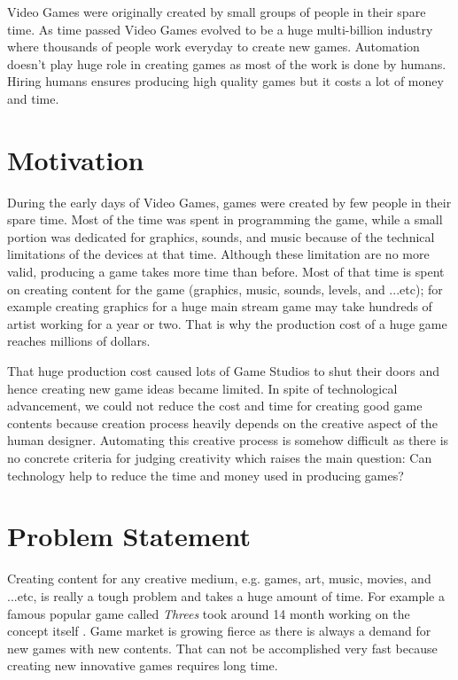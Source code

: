 Video Games were originally created by small groups of people in their spare time. As time passed Video Games evolved to be a huge multi-billion industry where thousands of people work everyday to create new games. Automation doesn't play huge role in creating games as most of the work is done by humans. Hiring humans ensures producing high quality games but it costs a lot of money and time.

\section{Motivation}
During the early days of Video Games, games were created by few people in their spare time. Most of the time was spent in programming the game, while a small portion was dedicated for graphics, sounds, and music because of the technical limitations of the devices at that time. Although these limitation are no more valid, producing a game takes more time than before. Most of that time is spent on creating content for the game (graphics, music, sounds, levels, and ...etc)\cite{budgetAAA}; for example creating graphics for a huge main stream game may take hundreds of artist working for a year or two. That is why the production cost of a huge game reaches millions of dollars\cite{gameCost}.\\\par

That huge production cost caused lots of Game Studios to shut their doors \cite{gameCloses} and hence creating new game ideas became limited. In spite of technological advancement, we could not reduce the cost and time for creating good game contents because creation process heavily depends on the creative aspect of the human designer. Automating this creative process is somehow difficult as there is no concrete criteria for judging creativity which raises the main question: Can technology help to reduce the time and money used in producing games?

\section{Problem Statement}
Creating content for any creative medium, e.g. games, art, music, movies, and ...etc, is really a tough problem and takes a huge amount of time. For example a famous popular game called \emph{Threes} took around 14 month working on the concept itself \cite{threesTime}. Game market is growing fierce as there is always a demand for new games with new contents. That can not be accomplished very fast because creating new innovative games requires long time.\\\par

